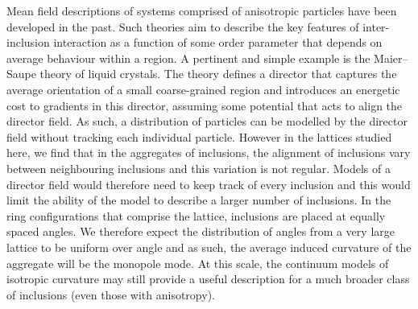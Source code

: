 Mean field descriptions of systems comprised of anisotropic particles have been developed in the past. Such theories aim to describe the key features of inter-inclusion interaction as a function of some order parameter that depends on average behaviour within a region. A pertinent and simple example is the Maier–Saupe theory of liquid crystals. The theory defines a director that captures the average orientation of a small coarse-grained region and introduces an energetic cost to gradients in this director, assuming some potential that acts to align the director field. As such, a distribution of particles can be modelled by the director field without tracking each individual particle. However in the lattices studied here, we find that in the aggregates of inclusions, the alignment of inclusions vary between neighbouring inclusions and this variation is not regular. Models of a director field would therefore need to keep track of every inclusion and this would limit the ability of the model to describe a larger number of inclusions. In the ring configurations that comprise the lattice, inclusions are placed at equally spaced angles. We therefore expect the distribution of angles from a very large lattice to be uniform over angle and as such, the average induced curvature of the aggregate will be the monopole mode. At this scale, the continuum models of isotropic curvature may still provide a useful description for a much broader class of inclusions (even those with anisotropy).
